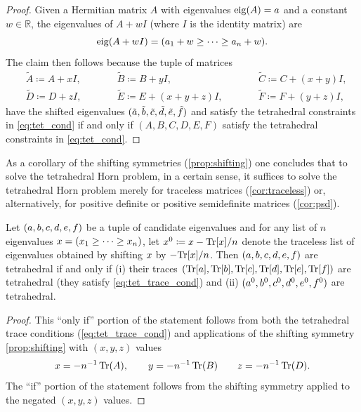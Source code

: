 \documentclass[notitlepage, 11pt, letterpaper]{amsart}
\begin{document}
\begin{proof}
    Given a Hermitian matrix $A$ with eigenvalues $\operatorname{eig}(A) = a$ and a constant $w \in \mathbb R$, the eigenvalues of $A+wI$ (where $I$ is the identity matrix) are
    \begin{equation}
        \operatorname{eig}(A+wI) = (a_1 + w \geq \cdots \geq a_n + w).
    \end{equation}
    The claim then follows because the tuple of matrices
    \begin{equation}
        \begin{alignedat}{3}
             &\tilde A \coloneqq A + xI, \qquad
            &&\tilde B \coloneqq B + yI, \qquad
            &&\tilde C \coloneqq C + (x + y)I, \\
             &\tilde D \coloneqq D + zI, \qquad
            &&\tilde E \coloneqq E + (x + y + z)I, \qquad
            &&\tilde F \coloneqq F + (y + z)I,
        \end{alignedat}
    \end{equation}
    have the shifted eigenvalues $(\tilde {a}, \tilde {b}, \tilde {c}, \tilde {d}, \tilde {e},\tilde {f})$ and satisfy the tetrahedral constraints in \cref{eq:tet_cond} if and only if $(A,B,C,D,E,F)$ satisfy the tetrahedral constraints in \cref{eq:tet_cond}.
\end{proof}
As a corollary of the shifting symmetries (\cref{prop:shifting}) one concludes that to solve the tetrahedral Horn problem, in a certain sense, it suffices to solve the tetrahedral Horn problem merely for traceless matrices (\cref{cor:traceless}) or, alternatively, for positive definite or positive semidefinite matrices (\cref{cor:psd}).
\begin{cor}
    \label{cor:traceless}
    Let $(a, b, c, d, e, f)$ be a tuple of candidate eigenvalues and for any list of $n$ eigenvalues $x = (x_1 \geq \cdots \geq x_n)$, let $x^{0} \coloneqq x - {\operatorname{Tr}[x]}/n$ denote the traceless list of eigenvalues obtained by shifting $x$ by $-{\operatorname{Tr}[x]}/n$.
    Then $(a, b, c, d, e, f)$ are tetrahedral if and only if (i) their traces $({\operatorname{Tr}[a]}, {\operatorname{Tr}[b]}, {\operatorname{Tr}[c]}, {\operatorname{Tr}[d]}, {\operatorname{Tr}[e]}, {\operatorname{Tr}[f]})$ are tetrahedral (they satisfy \cref{eq:tet_trace_cond}) and (ii) $(a^0, b^0, c^0, d^0, e^0, f^0)$ are tetrahedral.
\end{cor}
\begin{proof}
    This ``only if'' portion of the statement follows from both the tetrahedral trace conditions (\cref{eq:tet_trace_cond}) and applications of the shifting symmetry \cref{prop:shifting} with $(x,y,z)$ values
    \begin{equation}
        x = - n^{-1}\operatorname{Tr}(A), \qquad
        y = - n^{-1}\operatorname{Tr}(B) \qquad
        z = - n^{-1}\operatorname{Tr}(D).
    \end{equation}
    The ``if'' portion of the statement follows from the shifting symmetry applied to the negated $(x,y,z)$ values.
\end{proof}
\end{document}
